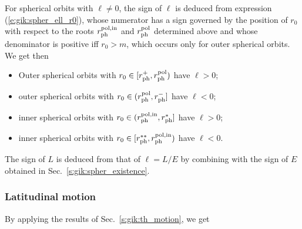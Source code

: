 For spherical orbits with $\ell\neq 0$,
the sign of $\ell$ is deduced from expression (\ref{e:gik:spher_ell_r0}),
whose numerator has a sign governed by the position of $r_0$ with respect to the
roots $r_{\rm ph}^{\rm pol,in}$ and $r_{\rm ph}^{\rm pol}$ determined above and whose denominator is positive iff $r_0 > m$, which occurs
only for outer spherical orbits. We get then
\begin{prop}
\begin{itemize}
\item Outer spherical orbits with $r_0 \in [r_{\rm ph}^+, r_{\rm ph}^{\rm pol})$ %
have $\ell > 0$;
\item outer spherical orbits with $r_0 \in (r_{\rm ph}^{\rm pol}, r_{\rm ph}^-]$ %
have $\ell < 0$;
\item inner spherical orbits with $r_0 \in (r_{\rm ph}^{\rm pol,in}, r_{\rm ph}^*]$
have $\ell > 0$;
\item inner spherical orbits with $r_0 \in [r_{\rm ph}^{**}, r_{\rm ph}^{\rm pol,in})$ %
have $\ell < 0$.
\end{itemize}
\end{prop}
The sign of $L$ is deduced from that of $\ell = L/E$ by combining with the sign of $E$ obtained
in Sec.~\ref{s:gik:spher_existence}.

\subsubsection{Latitudinal motion}

By applying the results of Sec.~\ref{s:gik:th_motion}, we get


